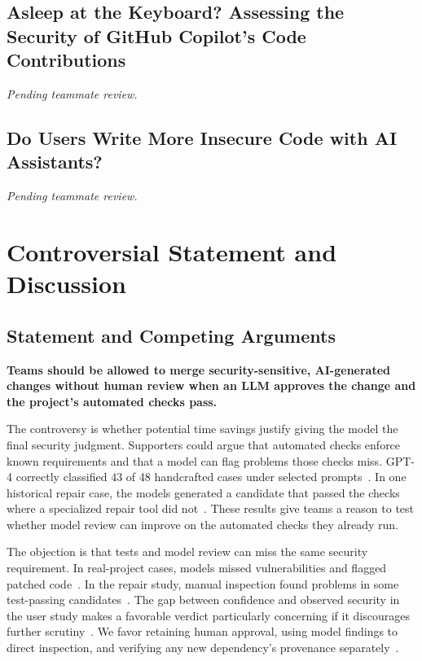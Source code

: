 \documentclass[conference]{IEEEtran}
\begin{document}
\subsection{Asleep at the Keyboard? Assessing the Security of GitHub Copilot's Code Contributions}
\emph{Pending teammate review.}

\subsection{Do Users Write More Insecure Code with AI Assistants?}
\emph{Pending teammate review.}







\section{Controversial Statement and Discussion}\label{sec:discussion}
\subsection{Statement and Competing Arguments}
\textbf{Teams should be allowed to merge security-sensitive, AI-generated changes without human review when an LLM approves the change and the project's automated checks pass.}

The controversy is whether potential time savings justify giving the model the final security judgment. Supporters could argue that automated checks enforce known requirements and that a model can flag problems those checks miss. GPT-4 correctly classified 43 of 48 handcrafted cases under selected prompts~\cite{ullah2024secllmholmes}. In one historical repair case, the models generated a candidate that passed the checks where a specialized repair tool did not~\cite{pearce2023repair}. These results give teams a reason to test whether model review can improve on the automated checks they already run.

The objection is that tests and model review can miss the same security requirement. In real-project cases, models missed vulnerabilities and flagged patched code~\cite{ullah2024secllmholmes}. In the repair study, manual inspection found problems in some test-passing candidates~\cite{pearce2023repair}. The gap between confidence and observed security in the user study makes a favorable verdict particularly concerning if it discourages further scrutiny~\cite{perry2023insecure}. We favor retaining human approval, using model findings to direct inspection, and verifying any new dependency's provenance separately~\cite{spracklen2025packages}.
\end{document}
